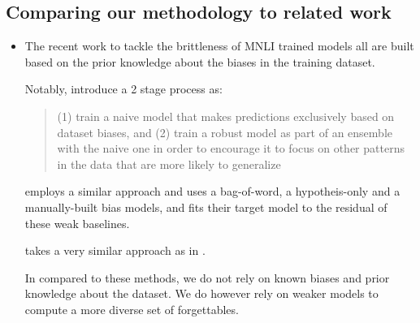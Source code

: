 \subsection{Comparing our methodology to related work}
\begin{itemize}
    \item The recent work to tackle the brittleness of MNLI trained models all are built based on the prior knowledge about the biases
    in the training dataset. 
    
    
    Notably,  introduce a 2 stage process as:
\begin{quote}
        (1)
train a naive model that makes predictions exclusively based on dataset biases, and (2) train
a robust model as part of an ensemble with the
naive one in order to encourage it to focus on
other patterns in the data that are more likely to
generalize
    \end{quote}
    
     employs a similar approach and uses a bag-of-word, a hypotheis-only and a manually-built bias models, and fits 
    their target model to the residual of these weak baselines.
    
     takes a very similar approach as in .
    
    In compared to these methods, we do not rely on known biases and prior knowledge about the dataset.
    We do however rely on weaker models to compute a more diverse set of forgettables.

\end{itemize}
\fi